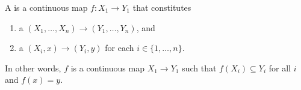\begin{definition} \label{definition:morphism_of_pointed_n_tuples_of_topological_spaces}
    A  is a continuous map $f: X_1 \to Y_1$ that constitutes
    \begin{enumerate}
        \item a  $(X_1, \dots, X_n) \to (Y_1, \dots, Y_n)$, and
        \item a  $(X_i, x) \to (Y_i, y)$ for each $i \in \{1, \dots, n\}$.
    \end{enumerate}
    In other words, $f$ is a continuous map $X_1 \to Y_1$ such that $f(X_i) \subseteq Y_i$ for all $i$ and $f(x) = y$.
\end{definition}